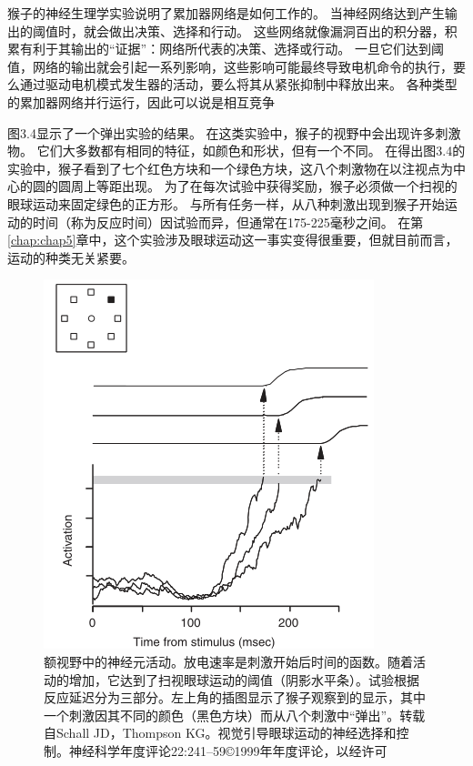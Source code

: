 猴子的神经生理学实验说明了累加器网络是如何工作的。
当神经网络达到产生输出的阈值时，就会做出决策、选择和行动。
这些网络就像漏洞百出的积分器，积累有利于其输出的“证据”：网络所代表的决策、选择或行动。
一旦它们达到阈值，网络的输出就会引起一系列影响，这些影响可能最终导致电机命令的执行，要么通过驱动电机模式发生器的活动，要么将其从紧张抑制中释放出来。
各种类型的累加器网络并行运行，因此可以说是相互竞争\par


图3.4显示了一个弹出实验的结果。
在这类实验中，猴子的视野中会出现许多刺激物。
它们大多数都有相同的特征，如颜色和形状，但有一个不同。
在得出图3.4的实验中，猴子看到了七个红色方块和一个绿色方块，这八个刺激物在以注视点为中心的圆的圆周上等距出现。
为了在每次试验中获得奖励，猴子必须做一个扫视的眼球运动来固定绿色的正方形。
与所有任务一样，从八种刺激出现到猴子开始运动的时间（称为反应时间）因试验而异，但通常在175-225毫秒之间。
在第\ref{chap:chap5}章中，这个实验涉及眼球运动这一事实变得很重要，但就目前而言，运动的种类无关紧要。\par


\begin{figure}[!htb]
	\centering
	\includegraphics{image_pfc/Fig_3_4}
	\caption{额视野中的神经元活动。放电速率是刺激开始后时间的函数。随着活动的增加，它达到了扫视眼球运动的阈值（阴影水平条）。试验根据反应延迟分为三部分。左上角的插图显示了猴子观察到的显示，其中一个刺激因其不同的颜色（黑色方块）而从八个刺激中“弹出”。转载自Schall JD，Thompson KG。视觉引导眼球运动的神经选择和控制。神经科学年度评论22:241–59©1999年年度评论，以经许可}
	\label{fig:fig}
\end{figure}


